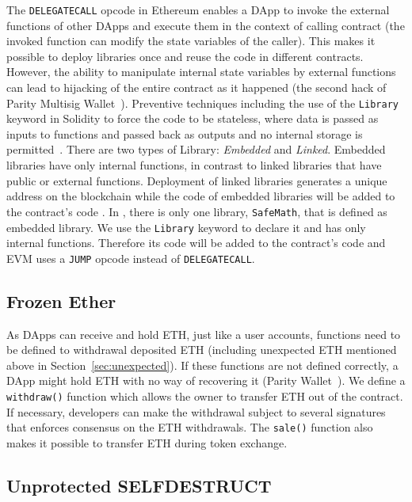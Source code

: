 The \texttt{DELEGATECALL} opcode in Ethereum enables a DApp to invoke the external functions of other DApps and execute them in the context of calling contract (\ie the invoked function can modify the state variables of the caller). This makes it possible to deploy libraries once and reuse the code in different contracts. However, the ability to manipulate internal state variables by external functions can lead to hijacking of the entire contract as it happened (\cf the second hack of Parity Multisig Wallet~\cite{ParitySecondHack}). Preventive techniques including the use of the \texttt{Library} keyword in Solidity to force the code to be stateless, where data is passed as inputs to functions and passed back as outputs and no internal storage is permitted~\cite{LIB1}. There are two types of Library: \textit{Embedded} and \textit{Linked}. Embedded libraries have only internal functions, in contrast to linked libraries that have public or external functions. Deployment of linked libraries generates a unique address on the blockchain while the code of embedded libraries will be added to the contract's code \cite{LIB2}. In \sys, there is only one library, \texttt{SafeMath}, that is defined as embedded library. We use the \texttt{Library} keyword to declare it and has only internal functions. Therefore its code will be added to the \erc contract's code and EVM uses a \texttt{JUMP} opcode instead of \texttt{DELEGATECALL}.

\subsection{Frozen Ether}

As DApps can receive and hold ETH, just like a user accounts, functions need to be defined to withdrawal deposited ETH (including unexpected ETH mentioned above in Section~\ref{sec:unexpected}). If these functions are not defined correctly, a DApp might hold ETH with no way of recovering it (\cf Parity Wallet~\cite{ParityWalletHack}). We define a \texttt{withdraw()} function which allows the owner to transfer ETH out of the contract. {\chg If necessary, developers can make the withdrawal subject to several signatures that enforces consensus on the ETH withdrawals.} The \texttt{sale()} function also makes it possible to transfer ETH during token exchange.

\subsection{Unprotected SELFDESTRUCT}

